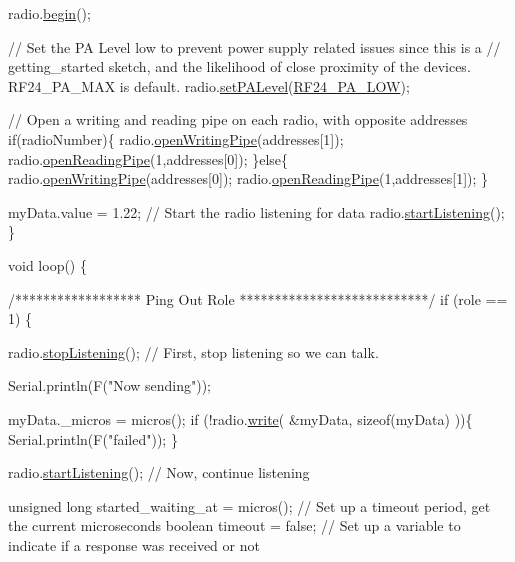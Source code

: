 \begin{DoxyCodeInclude}
  radio.\hyperlink{classRF24_a048a20c73c7d9b2e02dcbae6fb9c4ba8}{begin}();

  \textcolor{comment}{// Set the PA Level low to prevent power supply related issues since this is a}
 \textcolor{comment}{// getting\_started sketch, and the likelihood of close proximity of the devices. RF24\_PA\_MAX is default.}
  radio.\hyperlink{classRF24_adedac579590a668ae97baccab284de8a}{setPALevel}(\hyperlink{RF24_8h_a1e4cd0bea93e6b43422855fb0120aacea7d8d09f4a047b7c22655e56c98ca010c}{RF24\_PA\_LOW});
  
  \textcolor{comment}{// Open a writing and reading pipe on each radio, with opposite addresses}
  \textcolor{keywordflow}{if}(radioNumber)\{
    radio.\hyperlink{classRF24_af2e409e62d49a23e372a70b904ae30e1}{openWritingPipe}(addresses[1]);
    radio.\hyperlink{classRF24_a9edc910ccc1ffcff56814b08faca5535}{openReadingPipe}(1,addresses[0]);
  \}\textcolor{keywordflow}{else}\{
    radio.\hyperlink{classRF24_af2e409e62d49a23e372a70b904ae30e1}{openWritingPipe}(addresses[0]);
    radio.\hyperlink{classRF24_a9edc910ccc1ffcff56814b08faca5535}{openReadingPipe}(1,addresses[1]);
  \}
  
  myData.value = 1.22;
  \textcolor{comment}{// Start the radio listening for data}
  radio.\hyperlink{classRF24_a30a2733a3889bdc331fe2d2f4f0f7b39}{startListening}();
\}




\textcolor{keywordtype}{void} loop() \{
  
  
\textcolor{comment}{/****************** Ping Out Role ***************************/}  
\textcolor{keywordflow}{if} (role == 1)  \{
    
    radio.\hyperlink{classRF24_a6f144d73fc447c8ac2d1a4166210fd88}{stopListening}();                                    \textcolor{comment}{// First, stop listening so we
       can talk.}
    
    
    Serial.println(F(\textcolor{stringliteral}{"Now sending"}));

    myData.\_micros = micros();
     \textcolor{keywordflow}{if} (!radio.\hyperlink{classRF24_a4cd4c198a47704db20b6b5cf0731cd58}{write}( &myData, \textcolor{keyword}{sizeof}(myData) ))\{
       Serial.println(F(\textcolor{stringliteral}{"failed"}));
     \}
        
    radio.\hyperlink{classRF24_a30a2733a3889bdc331fe2d2f4f0f7b39}{startListening}();                                    \textcolor{comment}{// Now, continue listening}
    
    \textcolor{keywordtype}{unsigned} \textcolor{keywordtype}{long} started\_waiting\_at = micros();               \textcolor{comment}{// Set up a timeout period, get the current
       microseconds}
    \textcolor{keywordtype}{boolean} timeout = \textcolor{keyword}{false};                                   \textcolor{comment}{// Set up a variable to indicate if a
       response was received or not}
    

\end{DoxyCodeInclude}
